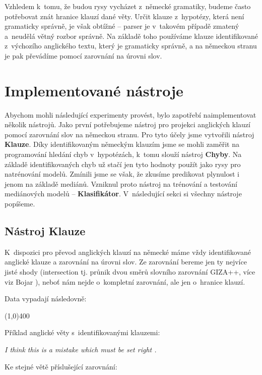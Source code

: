 \documentclass[12pt,a4paper]{report}
\begin{document}
Vzhledem k~tomu, že budou rysy vycházet z~německé gramatiky, budeme často potřebovat znát hranice klauzí dané věty. Určit klauze z~hypotézy, která není gramaticky správně, je však obtížné -- parser je v~takovém případě zmatený a~neudělá větný rozbor správně. Na základě toho používáme klauze identifikované z~výchozího anglického textu, který je gramaticky správně, a na německou stranu je pak převádíme pomocí zarovnání na úrovni slov. 

\section{Implementované nástroje}
Abychom mohli následující experimenty provést, bylo zapotřebí naimplementovat několik nástrojů. Jako první potřebujeme nástroj pro projekci anglických klauzí pomocí zarovnání slov na německou stranu. Pro tyto účely jsme vytvořili nástroj \textbf{Klauze}. Díky identifikovaným německým klauzím jsme se mohli zaměřit na programování hledání chyb v~hypotézách, k~tomu slouží nástroj \textbf{Chyby}. Na základě identifikovaných chyb už stačí jen tyto hodnoty použít jako rysy pro natrénování modelů. Zmínili jsme se však, že zkusíme predikovat plynulost i jenom na základě mediánů. Vzniknul proto nástroj na trénování a testování mediánových modelů -- \textbf{Klasifikátor}. V~následující sekci si všechny nástroje popíšeme.

\subsection{Nástroj Klauze}

K~dispozici pro převod anglických klauzí na německé máme vždy identifikované anglické klauze a zarovnání na úrovni slov. Ze zarovnání bereme jen ty nejvíce jisté shody (intersection tj. průnik dvou směrů slovního zarovnání GIZA++, více viz Bojar \cite{bojar}), neboť nám nejde o~kompletní zarovnání, ale jen o~hranice klauzí.

Data vypadají následovně:

\line(1,0){400}

Příklad anglické věty s~identifikovanými klauzemi:


\textit{\color{blue} I think this is a mistake which must be set right .\textbar}



Ke stejné větě příslušející zarovnání:
\end{document}
